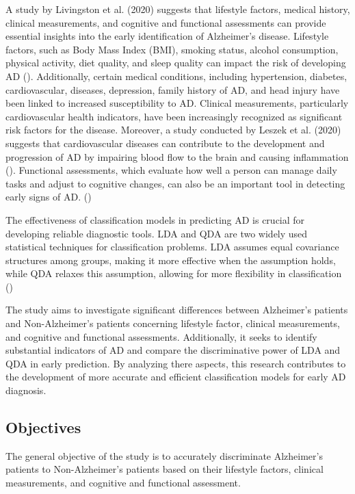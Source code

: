 \documentclass[12pt]{article}
\begin{document}
A study by Livingston et al. (2020) suggests that lifestyle factors, medical history, clinical measurements, and cognitive and functional assessments can provide essential insights into the
early identification of Alzheimer's disease. Lifestyle factors, such as Body Mass Index (BMI), smoking status, alcohol consumption, physical activity, diet quality, and sleep quality can impact 
the risk of developing AD (\cite{nih_healthy_lifestyle}). Additionally, certain medical conditions, including hypertension, diabetes, cardiovascular, diseases, depression, family history of AD, and
head injury have been linked to increased susceptibility to AD. Clinical measurements, particularly cardiovascular health indicators, have been increasingly recognized as significant
risk factors for the disease. Moreover, a study conducted by Leszek et al. (2020) suggests that cardiovascular diseases can contribute to the development and progression of AD by impairing blood flow to the brain
and causing inflammation (\cite{Leszek2021}). Functional assessments, which evaluate how well a person can manage daily tasks and adjust to cognitive changes, can also be an important tool in detecting early signs of AD. (\cite{sperling2011})

The effectiveness of classification models in predicting AD is crucial for developing reliable diagnostic tools. LDA and QDA are two widely used statistical techniques for classification problems. LDA assumes equal covariance structures
among groups, making it more effective when the assumption holds, while QDA relaxes this assumption, allowing for more flexibility in classification (\cite{elements_statistical_learning})

The study aims to investigate significant differences between Alzheimer's patients and Non-Alzheimer's patients concerning lifestyle factor, clinical measurements, and cognitive and functional assessments. Additionally, it seeks to identify 
substantial indicators of AD and compare the discriminative power of LDA and QDA in early prediction. By analyzing there aspects, this research contributes to the development of more accurate and efficient classification models for early AD 
diagnosis. 

\subsection{Objectives}
\noindent

The general objective of the study is to accurately discriminate Alzheimer's patients to Non-Alzheimer's patients based on their lifestyle factors, clinical measurements, and cognitive and functional assessment.
\end{document}
